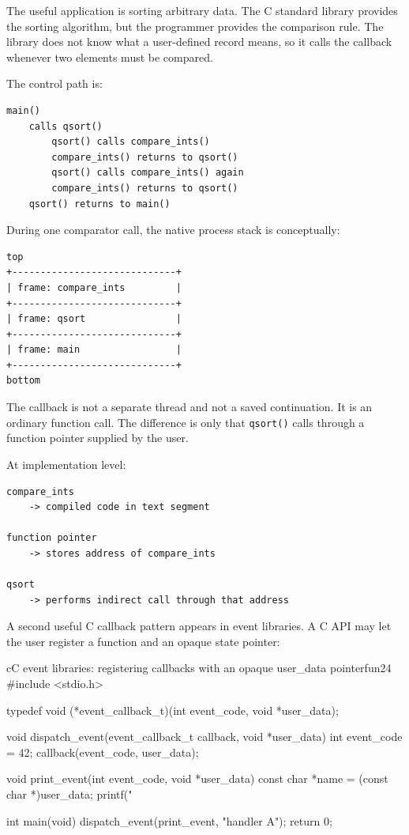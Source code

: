 The useful application is sorting arbitrary data. The C standard library provides the sorting algorithm, but the programmer provides the comparison rule. The library does not know what a user-defined record means, so it calls the callback whenever two elements must be compared.

The control path is:

\begin{verbatim}
main()
    calls qsort()
        qsort() calls compare_ints()
        compare_ints() returns to qsort()
        qsort() calls compare_ints() again
        compare_ints() returns to qsort()
    qsort() returns to main()
\end{verbatim}

During one comparator call, the native process stack is conceptually:

\begin{verbatim}
top
+-----------------------------+
| frame: compare_ints         |
+-----------------------------+
| frame: qsort                |
+-----------------------------+
| frame: main                 |
+-----------------------------+
bottom
\end{verbatim}

The callback is not a separate thread and not a saved continuation. It is an ordinary function call. The difference is only that \texttt{qsort()} calls through a function pointer supplied by the user.

At implementation level:

\begin{verbatim}
compare_ints
    -> compiled code in text segment

function pointer
    -> stores address of compare_ints

qsort
    -> performs indirect call through that address
\end{verbatim}

A second useful C callback pattern appears in event libraries. A C API may let the user register a function and an opaque state pointer:

\begin{codebox}[]{c}{C event libraries: registering callbacks with an opaque user\_data pointer}{fun24}
#include <stdio.h>

typedef void (*event_callback_t)(int event_code, void *user_data);

void dispatch_event(event_callback_t callback, void *user_data) {
    int event_code = 42;
    callback(event_code, user_data);
}

void print_event(int event_code, void *user_data) {
    const char *name = (const char *)user_data;
    printf("%
}

int main(void) {
    dispatch_event(print_event, "handler A");
    return 0;
}
\end{codebox}


